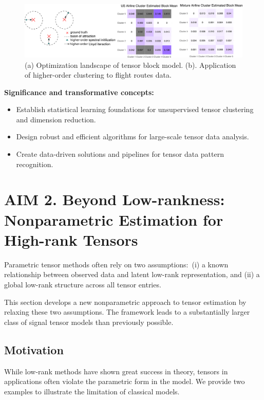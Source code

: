 \documentclass[11pt]{article}
\DeclareRobustCommand{\mybox}[2][gray!20]{%
\begin{tcolorbox}[   %
        breakable,
        left=0pt,
        right=0pt,
        top=0pt,
        bottom=0pt,
        colback=#1,
        colframe=#1,
        width=\dimexpr\textwidth\relax, 
        enlarge left by=0mm,
        boxsep=5pt,
        arc=0pt,outer arc=0pt,
        ]
        #2
\end{tcolorbox}}
\DeclareRobustCommand{\mybox}[2][gray!20]{%
\begin{tcolorbox}[   %
        breakable,
        left=0pt,
        right=0pt,
        top=0pt,
        bottom=0pt,
        colback=#1,
        colframe=#1,
        width=\dimexpr\textwidth\relax, 
        enlarge left by=0mm,
        boxsep=5pt,
        arc=0pt,outer arc=0pt,
        ]
        #2
\end{tcolorbox}
}
\theoremstyle{exampstyle}
\theoremstyle{definition}
\begin{document}
\begin{figure}[http]
\includegraphics[width=1\textwidth]{demo2.pdf}
\caption{(a) Optimization landscape of tensor block model. (b). Application of higher-order clustering to flight routes data.}\label{fig:app}
\end{figure}

\mybox[gray!20]{
{\bf Significance and transformative concepts:} 
\begin{itemize}[leftmargin=*]
\item Establish statistical learning foundations for unsupervised tensor clustering and dimension reduction. 
\item Design robust and efficient algorithms for large-scale tensor data analysis. 
\item Create data-driven solutions and pipelines for tensor data pattern recognition.
\end{itemize}
 }
 
 \vspace{-.3cm}
\section{AIM 2. Beyond Low-rankness: Nonparametric Estimation for High-rank Tensors}\label{sec:theme2}
\vspace{-.5cm}
Parametric tensor methods often rely on two assumptions:\ (i) a known relationship between observed data and latent low-rank representation, and (ii) a global low-rank structure across all tensor entries. 
\mybox[gray!20]{This section develops a new nonparametric approach to tensor estimation by relaxing these two assumptions. The framework leads to a substantially larger class of signal tensor models than previously possible. }

\vspace{-.3cm}
\subsection{Motivation}\label{sec:intro}
\vspace{-.3cm}
While low-rank methods have shown great success in theory, tensors in applications often violate the parametric form in the model. We provide two examples to illustrate the limitation of classical models.
\end{document}
